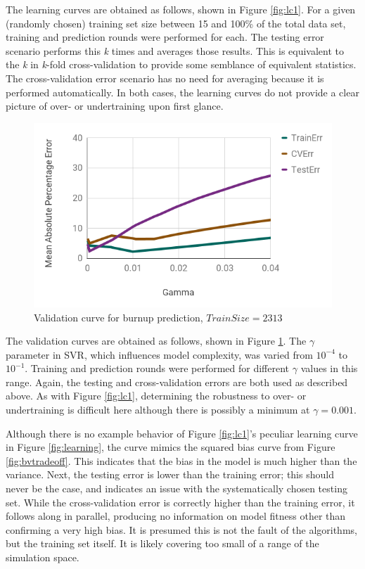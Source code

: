 The learning curves are obtained as follows, shown in Figure \ref{fig:lc1}.
For a given (randomly chosen) training set size between 15 and 100\% of the
total data set, training and prediction rounds were performed for each. The
testing error scenario performs this \textit{k} times and averages those
results.  This is equivalent to the \textit{k} in \textit{k}-fold
cross-validation to provide some semblance of equivalent statistics.  The
cross-validation error scenario has no need for averaging because it is
performed automatically. In both cases, the learning curves do not provide a
clear picture of over- or undertraining upon first glance.

\begin{figure}[!htb]
    \centering
    \includegraphics[width=\linewidth]{./chapters/demo_method/vc1.png}
    \caption{Validation curve for burnup prediction, $TrainSize = 2313$}
    \label{fig:vc1}
\end{figure}

The validation curves are obtained as follows, shown in Figure \ref{fig:vc1}.
The $\gamma$ parameter in \gls{SVR}, which influences model complexity, was
varied from $10^{-4}$ to $10^{-1}$. Training and prediction rounds were
performed for different $\gamma$ values in this range.  Again, the testing and
cross-validation errors are both used as described above. As with Figure
\ref{fig:lc1}, determining the robustness to over- or undertraining is
difficult here although there is possibly a minimum at $\gamma = 0.001$.

Although there is no example behavior of Figure \ref{fig:lc1}'s peculiar
learning curve in Figure \ref{fig:learning}, the curve mimics the squared bias
curve from Figure \ref{fig:bvtradeoff}. This indicates that the bias in the
model is much higher than the variance.  Next, the testing error is lower than
the training error; this should never be the case, and indicates an issue with
the systematically chosen testing set.  While the cross-validation error is
correctly higher than the training error, it follows along in parallel,
producing no information on model fitness other than confirming a very high
bias.  It is presumed this is not the fault of the algorithms, but the training
set itself.  It is likely covering too small of a range of the simulation
space.

